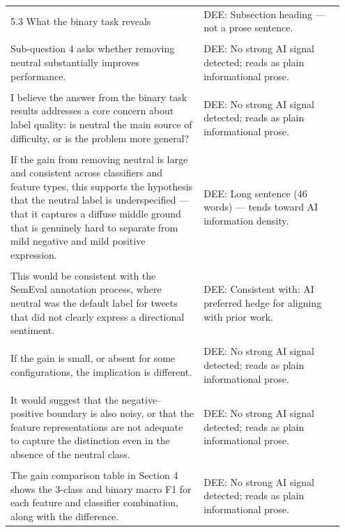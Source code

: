 \documentclass[11pt]{article}
\begin{document}
\begin{longtable}{|p{0.55\linewidth}|p{0.40\linewidth}|}
\hline
\rule{0pt}{3.5cm} & \\
\hline
5.3 What the binary task reveals & DEE: Subsection heading --- not a prose sentence. \\[2pt]
\hline
\rule{0pt}{3.5cm} & \\
\hline
Sub-question 4 asks whether removing neutral substantially improves performance. & DEE: No strong AI signal detected; reads as plain informational prose. \\[2pt]
\hline
\rule{0pt}{3.5cm} & \\
\hline
I believe the answer from the binary task results addresses a core concern about label quality: is neutral the main source of difficulty, or is the problem more general? & DEE: No strong AI signal detected; reads as plain informational prose. \\[2pt]
\hline
\rule{0pt}{3.5cm} & \\
\hline
If the gain from removing neutral is large and consistent across classifiers and feature types, this supports the hypothesis that the neutral label is underspecified --- that it captures a diffuse middle ground that is genuinely hard to separate from mild negative and mild positive expression. & DEE: Long sentence (46 words) --- tends toward AI information density. \\[2pt]
\hline
\rule{0pt}{3.5cm} & \\
\hline
This would be consistent with the SemEval annotation process, where neutral was the default label for tweets that did not clearly express a directional sentiment. & DEE: Consistent with: AI preferred hedge for aligning with prior work. \\[2pt]
\hline
\rule{0pt}{3.5cm} & \\
\hline
If the gain is small, or absent for some configurations, the implication is different. & DEE: No strong AI signal detected; reads as plain informational prose. \\[2pt]
\hline
\rule{0pt}{3.5cm} & \\
\hline
It would suggest that the negative--positive boundary is also noisy, or that the feature representations are not adequate to capture the distinction even in the absence of the neutral class. & DEE: No strong AI signal detected; reads as plain informational prose. \\[2pt]
\hline
\rule{0pt}{3.5cm} & \\
\hline
The gain comparison table in Section 4 shows the 3-class and binary macro F1 for each feature and classifier combination, along with the difference. & DEE: No strong AI signal detected; reads as plain informational prose. \\[2pt]

\end{longtable}
\end{document}
